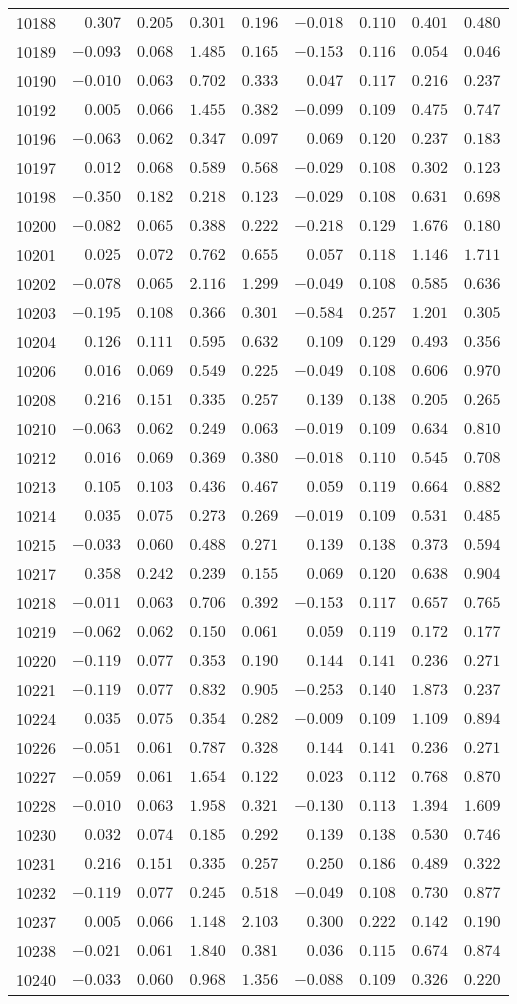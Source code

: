 {\begin{longtable}{l|rrrr|rrrr}
10188&$ 0.307$&$0.205$&$0.301$&$0.196$&$-0.018$&$0.110$&$0.401$&$0.480$\tabularnewline
10189&$-0.093$&$0.068$&$1.485$&$0.165$&$-0.153$&$0.116$&$0.054$&$0.046$\tabularnewline
10190&$-0.010$&$0.063$&$0.702$&$0.333$&$ 0.047$&$0.117$&$0.216$&$0.237$\tabularnewline
10192&$ 0.005$&$0.066$&$1.455$&$0.382$&$-0.099$&$0.109$&$0.475$&$0.747$\tabularnewline
10196&$-0.063$&$0.062$&$0.347$&$0.097$&$ 0.069$&$0.120$&$0.237$&$0.183$\tabularnewline
10197&$ 0.012$&$0.068$&$0.589$&$0.568$&$-0.029$&$0.108$&$0.302$&$0.123$\tabularnewline
10198&$-0.350$&$0.182$&$0.218$&$0.123$&$-0.029$&$0.108$&$0.631$&$0.698$\tabularnewline
10200&$-0.082$&$0.065$&$0.388$&$0.222$&$-0.218$&$0.129$&$1.676$&$0.180$\tabularnewline
10201&$ 0.025$&$0.072$&$0.762$&$0.655$&$ 0.057$&$0.118$&$1.146$&$1.711$\tabularnewline
10202&$-0.078$&$0.065$&$2.116$&$1.299$&$-0.049$&$0.108$&$0.585$&$0.636$\tabularnewline
10203&$-0.195$&$0.108$&$0.366$&$0.301$&$-0.584$&$0.257$&$1.201$&$0.305$\tabularnewline
10204&$ 0.126$&$0.111$&$0.595$&$0.632$&$ 0.109$&$0.129$&$0.493$&$0.356$\tabularnewline
10206&$ 0.016$&$0.069$&$0.549$&$0.225$&$-0.049$&$0.108$&$0.606$&$0.970$\tabularnewline
10208&$ 0.216$&$0.151$&$0.335$&$0.257$&$ 0.139$&$0.138$&$0.205$&$0.265$\tabularnewline
10210&$-0.063$&$0.062$&$0.249$&$0.063$&$-0.019$&$0.109$&$0.634$&$0.810$\tabularnewline
10212&$ 0.016$&$0.069$&$0.369$&$0.380$&$-0.018$&$0.110$&$0.545$&$0.708$\tabularnewline
10213&$ 0.105$&$0.103$&$0.436$&$0.467$&$ 0.059$&$0.119$&$0.664$&$0.882$\tabularnewline
10214&$ 0.035$&$0.075$&$0.273$&$0.269$&$-0.019$&$0.109$&$0.531$&$0.485$\tabularnewline
10215&$-0.033$&$0.060$&$0.488$&$0.271$&$ 0.139$&$0.138$&$0.373$&$0.594$\tabularnewline
10217&$ 0.358$&$0.242$&$0.239$&$0.155$&$ 0.069$&$0.120$&$0.638$&$0.904$\tabularnewline
10218&$-0.011$&$0.063$&$0.706$&$0.392$&$-0.153$&$0.117$&$0.657$&$0.765$\tabularnewline
10219&$-0.062$&$0.062$&$0.150$&$0.061$&$ 0.059$&$0.119$&$0.172$&$0.177$\tabularnewline
10220&$-0.119$&$0.077$&$0.353$&$0.190$&$ 0.144$&$0.141$&$0.236$&$0.271$\tabularnewline
10221&$-0.119$&$0.077$&$0.832$&$0.905$&$-0.253$&$0.140$&$1.873$&$0.237$\tabularnewline
10224&$ 0.035$&$0.075$&$0.354$&$0.282$&$-0.009$&$0.109$&$1.109$&$0.894$\tabularnewline
10226&$-0.051$&$0.061$&$0.787$&$0.328$&$ 0.144$&$0.141$&$0.236$&$0.271$\tabularnewline
10227&$-0.059$&$0.061$&$1.654$&$0.122$&$ 0.023$&$0.112$&$0.768$&$0.870$\tabularnewline
10228&$-0.010$&$0.063$&$1.958$&$0.321$&$-0.130$&$0.113$&$1.394$&$1.609$\tabularnewline
10230&$ 0.032$&$0.074$&$0.185$&$0.292$&$ 0.139$&$0.138$&$0.530$&$0.746$\tabularnewline
10231&$ 0.216$&$0.151$&$0.335$&$0.257$&$ 0.250$&$0.186$&$0.489$&$0.322$\tabularnewline
10232&$-0.119$&$0.077$&$0.245$&$0.518$&$-0.049$&$0.108$&$0.730$&$0.877$\tabularnewline
10237&$ 0.005$&$0.066$&$1.148$&$2.103$&$ 0.300$&$0.222$&$0.142$&$0.190$\tabularnewline
10238&$-0.021$&$0.061$&$1.840$&$0.381$&$ 0.036$&$0.115$&$0.674$&$0.874$\tabularnewline
10240&$-0.033$&$0.060$&$0.968$&$1.356$&$-0.088$&$0.109$&$0.326$&$0.220$\tabularnewline
\hline
\end{longtable}}



